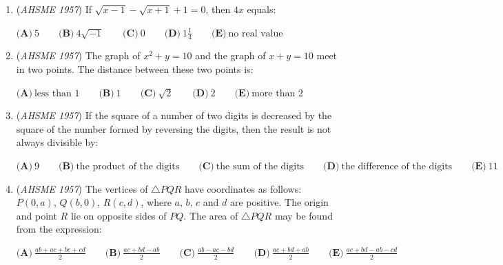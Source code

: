 \begin{enumerate}
 1. If two angles of a triangle are not equal, the triangle is not isosceles. 


 2. The base angles of an isosceles triangle are equal. 


 3. If a triangle is not isosceles, then two of its angles are not equal. 


 4. A necessary condition that two angles of a triangle be equal is that the triangle be isosceles. 


 Which combination of statements contains only those which are logically equivalent to the given theorem? 


 $\textbf{(A)}\ 1,\,2,\,3,\,4 \qquad \textbf{(B)}\ 1,\,2,\,3\qquad \textbf{(C)}\ 2,\,3,\,4\qquad \textbf{(D)}\ 1,\,2\qquad\textbf{(E)}\ 3,\,4$


	\item (\textit{AHSME 1957}) If $\sqrt{x - 1} - \sqrt{x + 1} + 1 = 0$, then $4x$ equals: 


 $\textbf{(A)}\ 5 \qquad \textbf{(B)}\ 4\sqrt{-1}\qquad \textbf{(C)}\ 0\qquad \textbf{(D)}\ 1\frac{1}{4}\qquad \textbf{(E)}\ \text{no real value}$


	\item (\textit{AHSME 1957}) The graph of $x^2 + y = 10$ and the graph of $x + y = 10$ meet in two points. The distance between these two points is: 


 $\textbf{(A)}\ \text{less than 1} \qquad \textbf{(B)}\ 1\qquad \textbf{(C)}\ \sqrt{2}\qquad \textbf{(D)}\ 2\qquad\textbf{(E)}\ \text{more than 2}$


	\item (\textit{AHSME 1957}) If the square of a number of two digits is decreased by the square of the number formed by reversing the digits, 
then the result is not always divisible by: 


 $\textbf{(A)}\ 9 \qquad  \textbf{(B)}\ \text{the product of the digits}\qquad  \textbf{(C)}\ \text{the sum of the digits}\qquad \textbf{(D)}\ \text{the difference of the digits}\qquad \textbf{(E)}\ 11$


	\item (\textit{AHSME 1957}) The vertices of $\triangle PQR$ have coordinates as follows: $P(0,a),\,Q(b,0),\,R(c,d)$, where $a,\,b,\,c$ and $d$ are positive. 
The origin and point $R$ lie on opposite sides of $PQ$. The area of $\triangle PQR$ may be found from the expression: 


 $\textbf{(A)}\ \frac{ab + ac + bc + cd}{2} \qquad  \textbf{(B)}\ \frac{ac + bd - ab}{2}\qquad  \textbf{(C)}\ \frac{ab-ac-bd}{2}\qquad \textbf{(D)}\ \frac{ac+bd+ab}{2}\qquad \textbf{(E)}\ \frac{ac+bd-ab-cd}{2}$



\end{enumerate}
